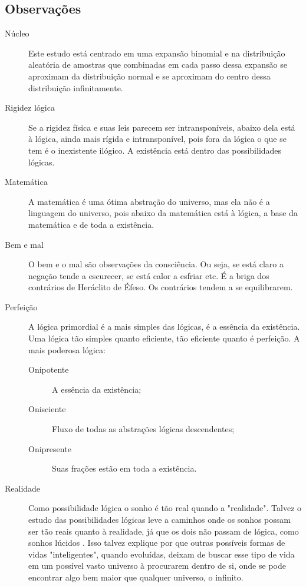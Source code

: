 \subsection{Observações}

\begin{description}
   \item[Núcleo] Este estudo está centrado em uma expansão binomial e na distribuição aleatória de amostras que combinadas em cada passo dessa expansão se aproximam da distribuição normal e se aproximam do centro dessa distribuição infinitamente.
   \item[Rigidez lógica] Se a rigidez física e suas leis parecem ser intransponíveis, abaixo dela está à lógica, ainda mais rígida e intransponível, pois fora da lógica o que se tem é o inexistente ilógico. A existência está dentro das possibilidades lógicas. 
   \item[Matemática] A matemática é uma ótima abstração do universo, mas ela não é a linguagem do universo, pois abaixo da matemática está à lógica, a base da matemática e de toda a existência.
   \item[Bem e mal] O bem e o mal são observações da consciência. Ou seja, se está claro a negação tende a escurecer, se está calor a esfriar etc. É a briga dos contrários de Heráclito de Éfeso. Os contrários tendem a se equilibrarem.
   \item[Perfeição] A lógica primordial é a mais simples das lógicas, é a essência da existência. Uma lógica tão simples quanto eficiente, tão eficiente quanto é perfeição. A mais poderosa lógica:
   \begin{description}
	   \item[Onipotente] A essência da existência;
	   \item[Onisciente] Fluxo de todas as abstrações lógicas descendentes; 
	   \item[Onipresente] Suas frações estão em toda a existência.
   \end{description}
   \item[Realidade] Como possibilidade lógica o sonho é tão real quando a "realidade". Talvez o estudo das possibilidades lógicas leve a caminhos onde os sonhos possam ser tão reais quanto à realidade, já que os dois não passam de lógica, como sonhos lúcidos \cite{ administradores_principio_pareto}. Isso talvez explique por que outras possíveis formas de vidas "inteligentes", quando evoluídas, deixam de buscar esse tipo de vida em um possível vasto universo à procurarem dentro de si, onde se pode encontrar algo bem maior que qualquer universo, o infinito.
\end{description}